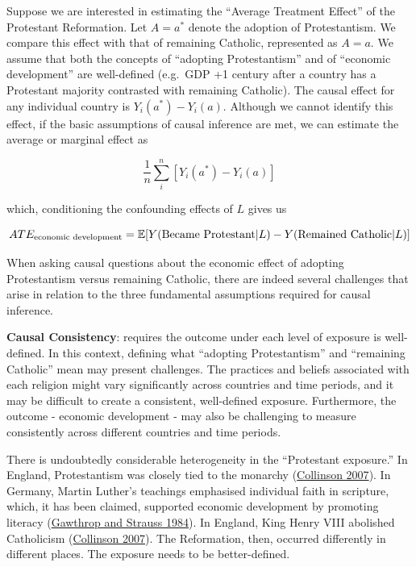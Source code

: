 \documentclass[
  singlecolumn]{article}
\begin{document}
Suppose we are interested in estimating the ``Average Treatment Effect''
of the Protestant Reformation. Let \(A = a^*\) denote the adoption of
Protestantism. We compare this effect with that of remaining Catholic,
represented as \(A = a\). We assume that both the concepts of ``adopting
Protestantism'' and of ``economic development'' are well-defined
(e.g.~GDP +1 century after a country has a Protestant majority
contrasted with remaining Catholic). The causal effect for any
individual country is \(Y_i(a^*) - Y_i(a)\). Although we cannot identify
this effect, if the basic assumptions of causal inference are met, we
can estimate the average or marginal effect as

\[
\frac{1}{n} \sum_i^{n} \left[ Y_i(a^*) - Y_i(a) \right]
\]

which, conditioning the confounding effects of \(L\) gives us

\[ATE_{\textnormal{economic~development}} = \mathbb{E}[Y(\textnormal{Became~Protestant}|L) - Y(\textnormal{Remained~Catholic}|L)]\]

When asking causal questions about the economic effect of adopting
Protestantism versus remaining Catholic, there are indeed several
challenges that arise in relation to the three fundamental assumptions
required for causal inference.

\textbf{Causal Consistency}: requires the outcome under each level of
exposure is well-defined. In this context, defining what ``adopting
Protestantism'' and ``remaining Catholic'' mean may present challenges.
The practices and beliefs associated with each religion might vary
significantly across countries and time periods, and it may be difficult
to create a consistent, well-defined exposure. Furthermore, the outcome
- economic development - may also be challenging to measure consistently
across different countries and time periods.

There is undoubtedly considerable heterogeneity in the ``Protestant
exposure.'' In England, Protestantism was closely tied to the monarchy
(\protect\hyperlink{ref-collinson2007}{Collinson 2007}). In Germany,
Martin Luther's teachings emphasised individual faith in scripture,
which, it has been claimed, supported economic development by promoting
literacy (\protect\hyperlink{ref-gawthrop1984}{Gawthrop and Strauss
1984}). In England, King Henry VIII abolished Catholicism
(\protect\hyperlink{ref-collinson2007}{Collinson 2007}). The
Reformation, then, occurred differently in different places. The
exposure needs to be better-defined.
\end{document}

